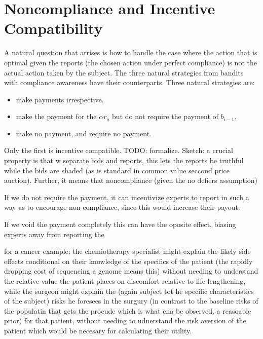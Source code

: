 \section{Noncompliance and Incentive Compatibility}

A natural question that arrises is how to handle the case where the action that is optimal given the reports (the chosen action under perfect compliance) is not the actual action taken by the subject. The three natural strategies from bandits with compliance awareness have their counterparts. Three natural strategies are:

\begin{itemize}
\item make payments irrespective. 
\item make the payment for the $\alpha r_a$ but do not require the payment of $b_{i-1}$.
\item make no payment, and require no payment.
\end{itemize}

Only the first is incentive compatible. TODO: formalize. Sketch: a crucial property is that w separate bids and reports, this lets the reports be truthful while the bids are shaded (as is standard in common value seccond price auction). Further, it means that noncompliance (given the no defiers assumption) 


If we do not require the payment, it can incentivize experts to report in such a way as to encourage non-compliance, since this would increase their payout. 


If we void the payment completely this can have the oposite effect, biasing experts away from reporting the 


for a cancer example; the chemiotherapy specialist might explain the likely side effects conditional on their knowledge of the specifics of the patient (the rapidly dropping cost of sequencing a genome means this) without needing to understand the relative value the patient places on discomfort relative to life lengthening, while the surgeon might explain the (again subject tot he specific characteristics of the subject) risks he foresees in the surgury (in contrast to the baseline risks of the populatin that gets the procude which is what cna be observed, a reasoable prior) for that patient, without needing to udnerstand the risk aversion of the patient which would be necesary for calculating their utility.

